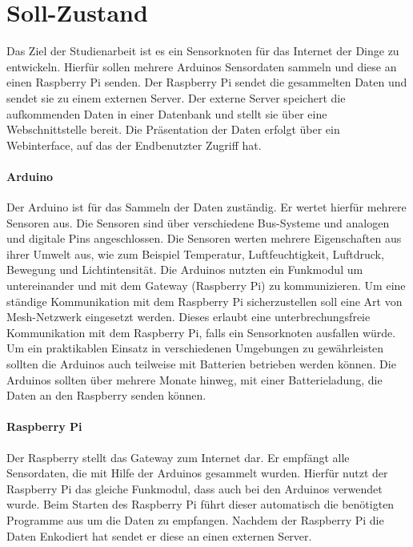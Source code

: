 \section{Soll-Zustand}
\label{sec:SollZustand}
Das Ziel der Studienarbeit ist es ein Sensorknoten für das Internet der Dinge zu entwickeln. Hierfür sollen mehrere Arduinos Sensordaten sammeln und diese an einen Raspberry Pi senden. Der Raspberry Pi sendet die gesammelten Daten und sendet sie zu einem externen Server. Der externe Server speichert die aufkommenden Daten in einer Datenbank und stellt sie über eine Webschnittstelle bereit. Die Präsentation der Daten erfolgt über ein Webinterface, auf das der Endbenutzter Zugriff hat. 
\paragraph{Arduino} Der Arduino ist für das Sammeln der Daten zuständig. Er wertet hierfür mehrere Sensoren aus. Die Sensoren sind über verschiedene Bus-Systeme und analogen und digitale Pins angeschlossen. Die Sensoren werten mehrere Eigenschaften aus ihrer Umwelt aus, wie zum Beispiel Temperatur, Luftfeuchtigkeit, Luftdruck, Bewegung und Lichtintensität. 
Die Arduinos nutzten ein Funkmodul um untereinander und mit dem Gateway (Raspberry Pi) zu kommunizieren. Um eine ständige Kommunikation mit dem Raspberry Pi sicherzustellen soll eine Art von Mesh-Netzwerk eingesetzt werden. Dieses erlaubt eine unterbrechungsfreie Kommunikation mit dem Raspberry Pi, falls ein Sensorknoten ausfallen würde.
Um ein praktikablen Einsatz in verschiedenen Umgebungen zu gewährleisten sollten die Arduinos auch teilweise mit Batterien betrieben werden können. Die Arduinos sollten über mehrere Monate hinweg, mit einer Batterieladung, die Daten an den Raspberry senden können.
\paragraph{Raspberry Pi}
Der Raspberry stellt das Gateway zum Internet dar. Er empfängt alle Sensordaten, die mit Hilfe der Arduinos gesammelt wurden. Hierfür nutzt der Raspberry Pi das gleiche Funkmodul, dass auch bei den Arduinos verwendet wurde. Beim Starten des Raspberry Pi führt dieser automatisch die benötigten Programme aus um die Daten zu empfangen. Nachdem der Raspberry Pi die Daten Enkodiert hat sendet er diese an einen externen Server.
